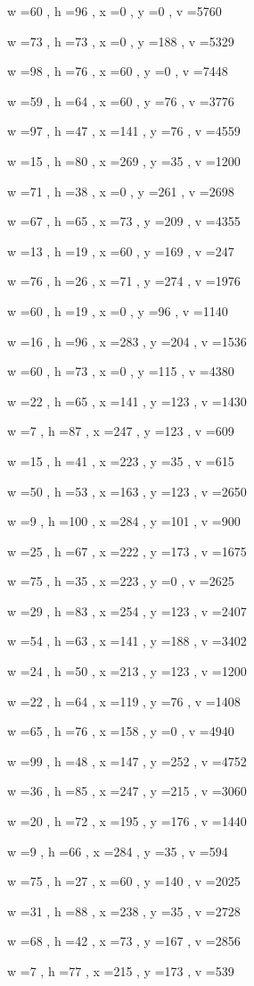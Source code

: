 \documentclass[11pt]{article}
\begin{document}
w =60 , h =96 , x =0 , y =0 , v =5760
\par
w =73 , h =73 , x =0 , y =188 , v =5329
\par
w =98 , h =76 , x =60 , y =0 , v =7448
\par
w =59 , h =64 , x =60 , y =76 , v =3776
\par
w =97 , h =47 , x =141 , y =76 , v =4559
\par
w =15 , h =80 , x =269 , y =35 , v =1200
\par
w =71 , h =38 , x =0 , y =261 , v =2698
\par
w =67 , h =65 , x =73 , y =209 , v =4355
\par
w =13 , h =19 , x =60 , y =169 , v =247
\par
w =76 , h =26 , x =71 , y =274 , v =1976
\par
w =60 , h =19 , x =0 , y =96 , v =1140
\par
w =16 , h =96 , x =283 , y =204 , v =1536
\par
w =60 , h =73 , x =0 , y =115 , v =4380
\par
w =22 , h =65 , x =141 , y =123 , v =1430
\par
w =7 , h =87 , x =247 , y =123 , v =609
\par
w =15 , h =41 , x =223 , y =35 , v =615
\par
w =50 , h =53 , x =163 , y =123 , v =2650
\par
w =9 , h =100 , x =284 , y =101 , v =900
\par
w =25 , h =67 , x =222 , y =173 , v =1675
\par
w =75 , h =35 , x =223 , y =0 , v =2625
\par
w =29 , h =83 , x =254 , y =123 , v =2407
\par
w =54 , h =63 , x =141 , y =188 , v =3402
\par
w =24 , h =50 , x =213 , y =123 , v =1200
\par
w =22 , h =64 , x =119 , y =76 , v =1408
\par
w =65 , h =76 , x =158 , y =0 , v =4940
\par
w =99 , h =48 , x =147 , y =252 , v =4752
\par
w =36 , h =85 , x =247 , y =215 , v =3060
\par
w =20 , h =72 , x =195 , y =176 , v =1440
\par
w =9 , h =66 , x =284 , y =35 , v =594
\par
w =75 , h =27 , x =60 , y =140 , v =2025
\par
w =31 , h =88 , x =238 , y =35 , v =2728
\par
w =68 , h =42 , x =73 , y =167 , v =2856
\par
w =7 , h =77 , x =215 , y =173 , v =539
\par
\newpage
\end{document}
